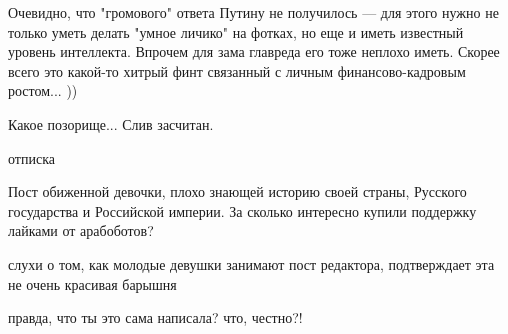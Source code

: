 \begin{itemize}
 
Очевидно, что "громового" ответа Путину не получилось — для этого нужно не
только уметь делать "умное личико" на фотках, но еще и иметь известный уровень
интеллекта. Впрочем для зама главреда его тоже неплохо иметь. Скорее всего это
какой-то хитрый финт связанный с личным финансово-кадровым ростом... ))


 
Какое позорище...
Слив засчитан.

 
отписка

 

Пост обиженной девочки, плохо знающей историю своей страны, Русского
государства и Российской империи. За сколько интересно купили поддержку лайками
от арабоботов?

 
слухи о том, как молодые девушки занимают пост редактора, подтверждает эта не очень красивая барышня

 
правда, что ты это сама написала? что, честно?!


\end{itemize}
